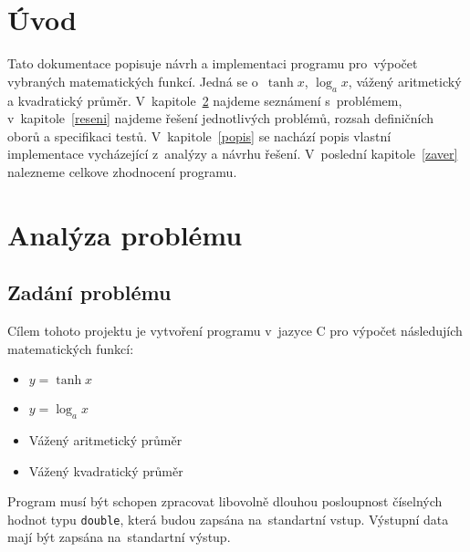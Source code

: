 \documentclass[12pt,a4paper,titlepage,final]{article}
\begin{document}

\def\author{Pavel Frýz}
\def\email{xfryzp00@stud.fit.vutbr.cz}
\def\projname{Iterační výpočty}



\pagestyle{plain}
\setcounter{page}{1}
\tableofcontents

\newpage
\pagestyle{plain}
\setcounter{page}{1}

\section{Úvod} \label{uvod}
Tato dokumentace popisuje návrh a implementaci programu pro~výpočet vybraných
matematických funkcí. Jedná se o~$\tanh{x}$, $\log_{a}{x}$, vážený aritmetický 
a kvadratický průměr. V~kapitole~\ref{analyza} najdeme seznámení s~problémem, 
v~kapitole~\ref{reseni} najdeme řešení jednotlivých problémů, rozsah definičních
oborů a specifikaci testů. V~kapitole~\ref{popis} se nachází popis vlastní implementace
vycházející z~analýzy a návrhu řešení. V~poslední kapitole~\ref{zaver} nalezneme celkove
zhodnocení programu.


\section{Analýza problému} \label{analyza}
\subsection{Zadání problému}

Cílem tohoto projektu je vytvoření programu v~jazyce C pro výpočet následujích
matematických funkcí:
\begin{itemize}
 \item $y=\tanh{x}$
 \item $y=\log_{a}x$
 \item Vážený aritmetický průměr
 \item Vážený kvadratický průměr
\end{itemize}
Program musí být schopen zpracovat libovolně dlouhou posloupnost číselných
hodnot typu \texttt{double}, která budou zapsána na~standartní vstup.
Výstupní data mají být zapsána na~standartní výstup.
\end{document}
